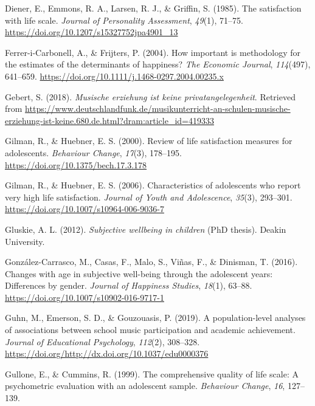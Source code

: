 \documentclass[a4, 12pt]{article}
\begin{document}
\leavevmode\hypertarget{ref-Diener1985}{}%
Diener, E., Emmons, R. A., Larsen, R. J., \& Griffin, S. (1985). The satisfaction with life scale. \emph{Journal of Personality Assessment}, \emph{49}(1), 71--75. \url{https://doi.org/10.1207/s15327752jpa4901_13}

\leavevmode\hypertarget{ref-iCarbonell2004}{}%
Ferrer-i-Carbonell, A., \& Frijters, P. (2004). How important is methodology for the estimates of the determinants of happiness? \emph{The Economic Journal}, \emph{114}(497), 641--659. \url{https://doi.org/10.1111/j.1468-0297.2004.00235.x}

\leavevmode\hypertarget{ref-Gebert2018}{}%
Gebert, S. (2018). \emph{Musische erziehung ist keine privatangelegenheit}. Retrieved from \url{https://www.deutschlandfunk.de/musikunterricht-an-schulen-musische-erziehung-ist-keine.680.de.html?dram:article_id=419333}

\leavevmode\hypertarget{ref-Gilman2000}{}%
Gilman, R., \& Huebner, E. S. (2000). Review of life satisfaction measures for adolescents. \emph{Behaviour Change}, \emph{17}(3), 178--195. \url{https://doi.org/10.1375/bech.17.3.178}

\leavevmode\hypertarget{ref-Gilman2006}{}%
Gilman, R., \& Huebner, E. S. (2006). Characteristics of adolescents who report very high life satisfaction. \emph{Journal of Youth and Adolescence}, \emph{35}(3), 293--301. \url{https://doi.org/10.1007/s10964-006-9036-7}

\leavevmode\hypertarget{ref-Gluskie2012}{}%
Gluskie, A. L. (2012). \emph{Subjective wellbeing in children} (PhD thesis). Deakin University.

\leavevmode\hypertarget{ref-GonzalezCarrasco2016}{}%
González-Carrasco, M., Casas, F., Malo, S., Viñas, F., \& Dinisman, T. (2016). Changes with age in subjective well-being through the adolescent years: Differences by gender. \emph{Journal of Happiness Studies}, \emph{18}(1), 63--88. \url{https://doi.org/10.1007/s10902-016-9717-1}

\leavevmode\hypertarget{ref-Guhn2019}{}%
Guhn, M., Emerson, S. D., \& Gouzouasis, P. (2019). A population-level analyses of associations between school music participation and academic achievement. \emph{Journal of Educational Psychology}, \emph{112}(2), 308--328. \url{https://doi.org/http://dx.doi.org/10.1037/edu0000376}

\leavevmode\hypertarget{ref-Gullone1999}{}%
Gullone, E., \& Cummins, R. (1999). The comprehensive quality of life scale: A psychometric evaluation with an adolescent sample. \emph{Behaviour Change}, \emph{16}, 127--139.
\end{document}
